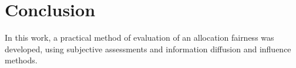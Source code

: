 \documentclass[conference,compsoc]{IEEEtran}
\begin{document}









\section{Conclusion}

In this work, a practical method of evaluation of an allocation fairness was developed, using subjective assessments and information diffusion and influence methods.
\end{document}
